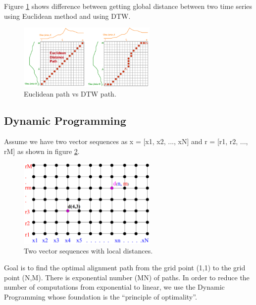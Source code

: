 \documentclass[12pt, a4paper, twoside]{report}
\begin{document}
Figure \ref{fig:dtw-diff-g} shows difference between getting global distance between two time series using Euclidean method and using DTW.
\begin{figure}[H]
	\centering
	\includegraphics[width=0.6\textwidth]
	{images/chapter4/dtw-diff-g}
	\caption{Euclidean path vs DTW path.}
	\label{fig:dtw-diff-g}
\end{figure}

\subsection{Dynamic Programming} 
Assume we have two vector sequences as x = [x1, x2, ..., xN] and r = [r1, r2, ..., rM] as shown in figure \ref{fig:dtw-dp}.
\begin{figure}[H]
	\centering
	\includegraphics[width=0.6\textwidth]
	{images/chapter4/dtw-dp}
	\caption{Two vector sequences with local distances.}
	\label{fig:dtw-dp}
\end{figure}

Goal is to find the optimal alignment path from the grid point (1,1) to the grid point (N,M). There is exponential number (MN) of paths. In order to reduce the number of computations from exponential to linear, we use the Dynamic Programming whose foundation is the ``principle of optimality''.
\end{document}
